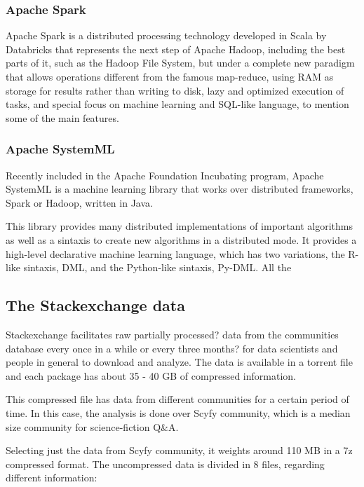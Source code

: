 \documentclass[11pt]{article} %
\begin{document}
  \subsubsection{Apache Spark}

    Apache Spark is a distributed processing technology developed in Scala by Databricks that represents the next step of Apache Hadoop, including the best parts of it, such as the Hadoop File System, but under a complete new paradigm that allows operations different from the famous map-reduce, using RAM as storage for results rather than writing to disk, lazy and optimized execution of tasks, and special focus on machine learning and SQL-like language, to mention some of the main features.

  \subsubsection{Apache SystemML}

    Recently included in the Apache Foundation Incubating  program, Apache SystemML is a machine learning library that works over distributed frameworks, Spark or Hadoop, written in Java.

    This library provides many distributed implementations of important algorithms as well as a sintaxis to create new algorithms in a distributed mode. It provides a high-level declarative machine learning language, which has two variations, the R-like sintaxis, DML, and the Python-like sintaxis, Py-DML. All the

  \subsection{The Stackexchange data}

    Stackexchange facilitates raw {partially processed?} data from the communities database every once in a while {or every three months?} for data scientists and people in general to download and analyze. The data is available in a torrent file and each package has about 35 - 40 GB of compressed information.

    This compressed file has data from different communities for a certain period of time. In this case, the analysis is done over Scyfy community, which is a median size community for science-fiction Q\&A.

    Selecting just the data from Scyfy community, it weights around 110 MB in a 7z compressed format. The uncompressed data is divided in 8 files, regarding different information:
\end{document}
